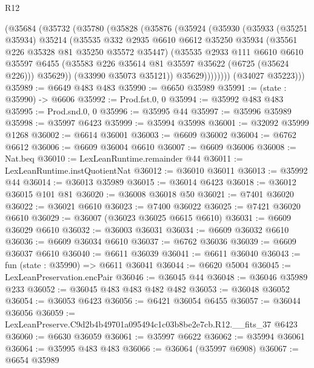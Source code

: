 \begin{lexlean}{R12}
\begin{coremodule}
          (@35684
            (@35732
              (@35780
                (@35828
                  (@35876
                    (@35924
                      (@35930
                        (@35933
                          (@35251 @35934)
                          @35214
                          (@35535
                            @332
                            @2935
                            @6610
                            @6612
                            @35250
                            @35934
                            (@35561 @226 @35328 @81 @35250 @35572 @35447)
                            (@35535
                              @2933
                              @111
                              @6610
                              @6610
                              @35597
                              @6455
                              (@35583 @226 @35614 @81 @35597 @35622 (@6725 (@35624 @226)))
                              @35629))
                          (@33990 @35073 @35121))
                        @35629))))))))
        (@34027 @35223)))
@35989 := @6649 @483 @483
@35990 := @6650 @35989
@35991 := (state : @35990) -> @6606
@35992 := Prod.fst.{0, 0}
@35994 := @35992 @483 @483
@35995 := Prod.snd.{0, 0}
@35996 := @35995 @44
@35997 := @35996 @35989
@35998 := @35997 @6423
@35999 := @35994 @35998
@36001 := @32092 @35999 @1268
@36002 := @6614 @36001
@36003 := @6609 @36002
@36004 := @6762 @6612
@36006 := @6609 @36004 @6610
@36007 := @6609 @36006
@36008 := Nat.beq
@36010 := LexLeanRuntime.remainder @44
@36011 := LexLeanRuntime.instQuotientNat
@36012 := @36010 @36011
@36013 := @35992 @44
@36014 := @36013 @35989
@36015 := @36014 @6423
@36018 := @36012 @36015 @101 @81
@36020 := @36008 @36018 @50
@36021 := @7401 @36020
@36022 := @36021 @6610
@36023 := @7400 @36022
@36025 := @7421 @36020 @6610
@36029 := @36007 (@36023 @36025 @6615 @6610)
@36031 := @6609 @36029 @6610
@36032 := @36003 @36031
@36034 := @6609 @36032 @6610
@36036 := @6609 @36034 @6610
@36037 := @6762 @36036
@36039 := @6609 @36037 @6610
@36040 := @6611 @36039
@36041 := @6611 @36040
@36043 := fun (state : @35990) => @6611 @36041
@36044 := @6620 @5004
@36045 := LexLeanPreservation.encPair
@36046 := @36045 @44
@36048 := @36046 @35989 @233
@36052 := @36045 @483 @483 @482 @482
@36053 := @36048 @36052
@36054 := @36053 @6423
@36056 := @6421 @36054 @6455
@36057 := @36044 @36056
@36059 := LexLeanPreserve.C9d2b4b49701a095494c1c03b8be2e7cb.R12.__fits_37 @6423
@36060 := @6630 @36059
@36061 := @35997 @6622
@36062 := @35994 @36061
@36064 := @35995 @483 @483
@36066 := @36064 (@35997 @6908)
@36067 := @6654 @35989

\end{coremodule}
\end{lexlean}

